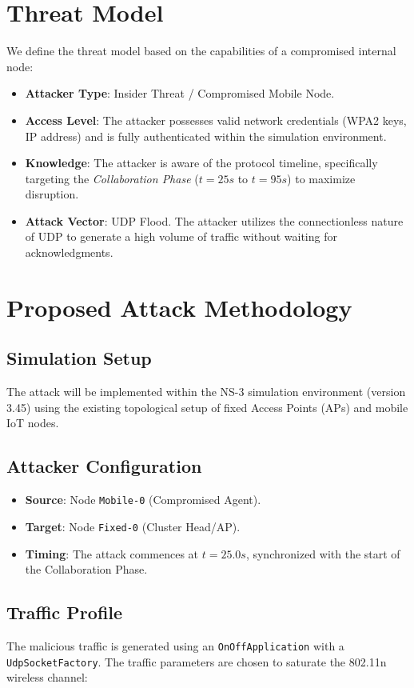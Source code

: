 \documentclass[conference]{IEEEtran}
\begin{document}
\section{Threat Model}
We define the threat model based on the capabilities of a compromised internal node:
\begin{itemize}
    \item \textbf{Attacker Type}: Insider Threat / Compromised Mobile Node.
    \item \textbf{Access Level}: The attacker possesses valid network credentials (WPA2 keys, IP address) and is fully authenticated within the simulation environment.
    \item \textbf{Knowledge}: The attacker is aware of the protocol timeline, specifically targeting the \textit{Collaboration Phase} ($t=25s$ to $t=95s$) to maximize disruption.
    \item \textbf{Attack Vector}: UDP Flood. The attacker utilizes the connectionless nature of UDP to generate a high volume of traffic without waiting for acknowledgments.
\end{itemize}

\section{Proposed Attack Methodology}

\subsection{Simulation Setup}
The attack will be implemented within the NS-3 simulation environment (version 3.45) using the existing topological setup of fixed Access Points (APs) and mobile IoT nodes.

\subsection{Attacker Configuration}
\begin{itemize}
    \item \textbf{Source}: Node \texttt{Mobile-0} (Compromised Agent).
    \item \textbf{Target}: Node \texttt{Fixed-0} (Cluster Head/AP).
    \item \textbf{Timing}: The attack commences at $t=25.0s$, synchronized with the start of the Collaboration Phase.
\end{itemize}

\subsection{Traffic Profile}
The malicious traffic is generated using an \texttt{OnOffApplication} with a \texttt{UdpSocketFactory}. The traffic parameters are chosen to saturate the 802.11n wireless channel:
\end{document}
